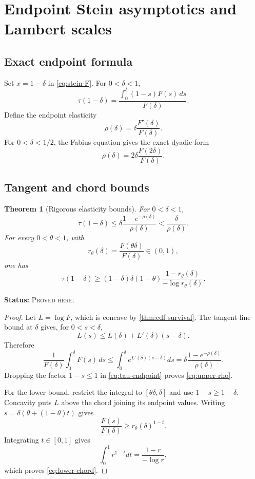 \documentclass[11pt,oneside]{article}
\newtheorem{theorem}{Theorem}[section]
\theoremstyle{definition}
\theoremstyle{remark}
\newcommand{\ProvedHere}{\textcolor{statusgreen}{\textsc{Proved here}}}
\newcommand{\Status}[1]{\par\smallskip\noindent\textbf{Status:} #1.\par\smallskip}
\begin{document}
\section{Endpoint Stein asymptotics and Lambert scales}

\subsection{Exact endpoint formula}
Set $x=1-\delta$ in \eqref{eq:stein-F}.  For $0<\delta<1$,
\begin{equation}\label{eq:tau-endpoint}
 \tau(1-\delta)
 =\frac{\displaystyle\int_0^\delta(1-s)F(s)\,ds}{F(\delta)}.
\end{equation}
Define the endpoint elasticity
\begin{equation}\label{eq:rho}
 \rho(\delta)=\delta\frac{F'(\delta)}{F(\delta)}.
\end{equation}
For $0<\delta<1/2$, the Fabius equation gives the exact dyadic form
\begin{equation}\label{eq:rho-dyadic}
 \rho(\delta)=2\delta\frac{F(2\delta)}{F(\delta)}.
\end{equation}

\subsection{Tangent and chord bounds}
\begin{theorem}[Rigorous elasticity bounds]\label{thm:endpoint-bounds}
For $0<\delta<1$,
\begin{equation}\label{eq:upper-rho}
 \tau(1-\delta)
 \le \delta\frac{1-e^{-\rho(\delta)}}{\rho(\delta)}
 <\frac{\delta}{\rho(\delta)}.
\end{equation}
For every $0<\theta<1$, with
\[
 r_\theta(\delta)=\frac{F(\theta\delta)}{F(\delta)}\in(0,1),
\]
one has
\begin{equation}\label{eq:lower-chord}
 \tau(1-\delta)
 \ge (1-\delta)\delta(1-\theta)
 \frac{1-r_\theta(\delta)}{-\log r_\theta(\delta)}.
\end{equation}
\end{theorem}
\Status{\ProvedHere}

\begin{proof}
Let $L=\log F$, which is concave by \cref{thm:cdf-survival}.  The tangent-line
bound at $\delta$ gives, for $0<s<\delta$,
\[
 L(s)\le L(\delta)+L'(\delta)(s-\delta).
\]
Therefore
\[
 \frac1{F(\delta)}\int_0^\delta F(s)\,ds
 \le\int_0^\delta e^{L'(\delta)(s-\delta)}ds
 =\delta\frac{1-e^{-\rho(\delta)}}{\rho(\delta)}.
\]
Dropping the factor $1-s\le1$ in \eqref{eq:tau-endpoint} proves
\eqref{eq:upper-rho}.

For the lower bound, restrict the integral to $[\theta\delta,\delta]$ and use
$1-s\ge1-\delta$.  Concavity puts $L$ above the chord joining its endpoint values.
Writing $s=\delta(\theta+(1-\theta)t)$ gives
\[
 \frac{F(s)}{F(\delta)}\ge r_\theta(\delta)^{1-t}.
\]
Integrating $t\in[0,1]$ gives
\[
 \int_0^1r^{1-t}dt=\frac{1-r}{-\log r},
\]
which proves \eqref{eq:lower-chord}.
\end{proof}
\end{document}
